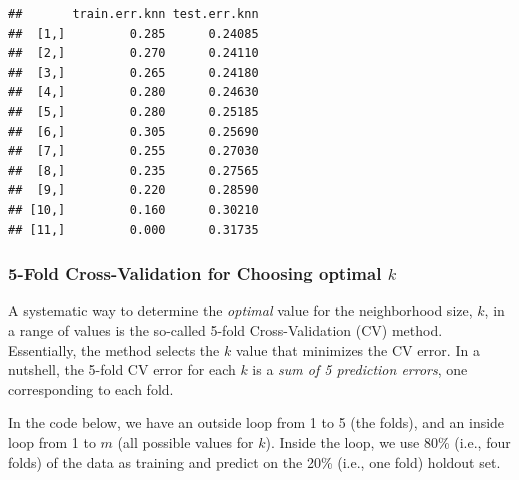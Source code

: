 \documentclass[
]{book}
\begin{document}
\begin{verbatim}
##       train.err.knn test.err.knn
##  [1,]         0.285      0.24085
##  [2,]         0.270      0.24110
##  [3,]         0.265      0.24180
##  [4,]         0.280      0.24630
##  [5,]         0.280      0.25185
##  [6,]         0.305      0.25690
##  [7,]         0.255      0.27030
##  [8,]         0.235      0.27565
##  [9,]         0.220      0.28590
## [10,]         0.160      0.30210
## [11,]         0.000      0.31735
\end{verbatim}

\subsubsection{\texorpdfstring{5-Fold Cross-Validation for Choosing optimal \(k\)}{5-Fold Cross-Validation for Choosing optimal k}}\label{fold-cross-validation-for-choosing-optimal-k}

A systematic way to determine the \emph{optimal} value for the neighborhood size, \(k\), in a range of values is the so-called 5-fold Cross-Validation (CV) method. Essentially, the method selects the \(k\) value that minimizes the CV error. In a nutshell, the 5-fold CV error for each \(k\) is a \emph{sum of 5 prediction errors}, one corresponding to each fold.

In the code below, we have an outside loop from 1 to 5 (the folds), and an inside loop from 1 to \(m\) (all possible values for \(k\)). Inside the loop, we use 80\% (i.e., four folds) of the data as training and predict on the 20\% (i.e., one fold) holdout set.
\end{document}
